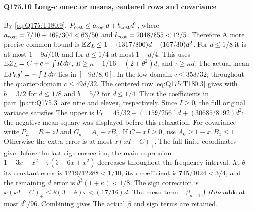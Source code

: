\paragraph{Q175.10 Long-connector means, centered rows and covariance}\label{part:Q175.10}
By \eqref{eq:Q175:T180.9},
$P_{\rm cost}\le\allowbreak  a_{\rm cost}d+b_{\rm cost}d^2$, where
$a_{\rm cost}=\allowbreak 7/10+169/304<\allowbreak 63/50$ and
$b_{\rm cost}=\allowbreak 2048/855<\allowbreak 12/5$.
Therefore
A more precise common bound is
$\mathbb E Z_L\le\allowbreak 1-(1317/800)d+(167/30)d^2$.
For $d\le\allowbreak 1/8$ it is at most $1-9d/10$, and for $d\le\allowbreak 1/4$ at most
$1-d/4$.
This uses $\mathbb E Z_L=\allowbreak C+c-\int R\,\allowbreak d\nu$,
$R\ge\allowbreak \kappa-1/16-(2+\theta^2)d$, and $\tau\ge\allowbreak \kappa d$.
The actual mean $\mathbb E P_Lg'=\allowbreak -\int I\,\allowbreak d\nu$ lies in $[-9d/8,\allowbreak 0]$.
In the low domain $c\le\allowbreak 35d/32$; throughout the quarter-domain
$c\le\allowbreak 49d/32$. The centered row \eqref{eq:Q175:T180.3} gives
with $b=\allowbreak 3/2$ for $d\le\allowbreak 1/8$ and $b=\allowbreak 5/2$ for $d\le\allowbreak 1/4$.
Thus the coefficients in part~\ref{part:Q175.3} are nine and eleven,
respectively.
Since $I\ge\allowbreak 0$, the full original variance satisfies
The upper is
$V_L=\allowbreak 45/32-(1159/256)d+(30685/8192)d^2$; the negative mean square
was displayed before this relaxation.
For covariance write $P_L=\allowbreak R+zI$ and $G_a=\allowbreak A_0+zB_1$.
If $C-xI\ge\allowbreak 0$, use $A_0\ge\allowbreak 1-x,\allowbreak B_1\le\allowbreak 1$.
Otherwise the extra error is at most $x(xI-C)_+$.
The full finite coordinates give
Before the last sign correction, the main expression
$1-3x+x^2-\tau(3-6x+x^2)$ decreases throughout the frequency interval.
At $\theta$ its constant error is $1219/12288<\allowbreak 1/10$,
its $\tau$ coefficient is $745/1024<\allowbreak 3/4$, and the remaining $d$ error
is $\theta^3(1+\kappa)<\allowbreak 1/8$.
The sign correction is
$x(xI-C)_+\le\allowbreak \theta(3-\theta)\tau<\allowbreak (17/16)d$.
The mean term $-\beta_{a+1}\int R\,\allowbreak d\nu$ adds at most $d^2/96$.
Combining gives
The actual $\beta$ and sign terms are retained.

